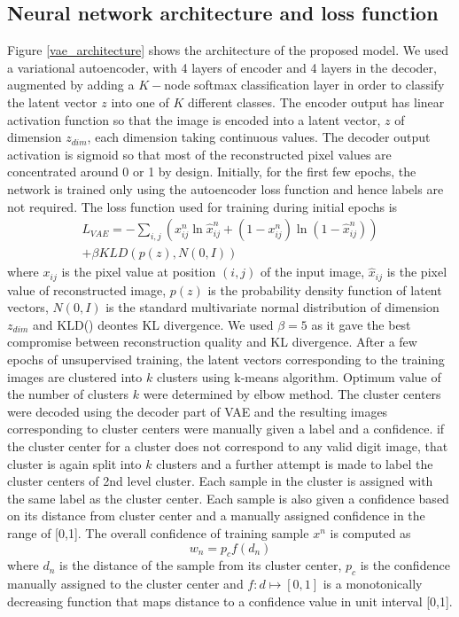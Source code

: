 \documentclass{uai2021} %
\begin{document}
\subsection{Neural network architecture and loss function}
Figure \ref{vae_architecture} shows the architecture of the proposed model.
We used a variational autoencoder\cite{kingma2013auto}, with 4 layers of encoder and 4 layers in the decoder, augmented by adding a $K-$node softmax classification layer in order to classify the latent vector $z$ into one of $K$ different classes.
The encoder output has linear activation function so that the image is encoded into a latent vector, $z$  of dimension $z_{dim}$, each dimension taking continuous values.
The decoder output activation is sigmoid so that most of the reconstructed pixel values  are concentrated around 0 or 1 by design.
Initially, for the first few epochs, the network is trained only using the autoencoder loss function and hence labels are not required.
The loss function used for training during initial epochs is
\begin{equation} \label{vae_loss_eqn}
\begin{split}
L_{VAE} = -\sum_{i, j}(x_{ij}^n \ln \hat{x}_{ij}^n
+ (1 - x_{ij}^n) \ln(1 -  \hat{x}_{ij}^n ) )\\
    +\beta KLD(p(z), N(0,I))
\end{split}
\end{equation}
where   $x_{ij}$ is the pixel value at position $(i, j)$ of the input image, $\hat{x}_{ij}$ is the pixel value of reconstructed image, $p(z)$ is the probability density function of latent vectors, $N(0,I)$ is the standard multivariate normal distribution of dimension $z_{dim}$ and KLD() deontes KL divergence.
We used $\beta = 5$ as it gave the best compromise between reconstruction quality and KL divergence.
After a few epochs of unsupervised training, the latent vectors corresponding to the training images are clustered into $k$ clusters using k-means algorithm.
Optimum value of the number of clusters $k$ were determined by elbow method.
The cluster centers were decoded using the decoder part of VAE and the resulting images corresponding to cluster centers were manually given a label and a confidence.
if the cluster center for a cluster does not correspond to any valid digit image, that cluster is again split into $k$ clusters and a further attempt is made to label the cluster centers of 2nd level cluster.
Each sample in the cluster is assigned with the  same label as the cluster center.
Each sample is also given a confidence based on its distance from cluster center and  a manually assigned confidence in the range of [0,1].
The overall confidence of  training sample $x^n$ is computed as
\begin{equation}
w_n = p_cf(d_n)
\end{equation}
where $d_n$ is the distance of the sample from its cluster center, $p_c$  is the confidence manually assigned to the cluster center and $f: d \mapsto [0,1]$ is a monotonically decreasing function that maps distance to a confidence value in unit interval [0,1].
\end{document}
